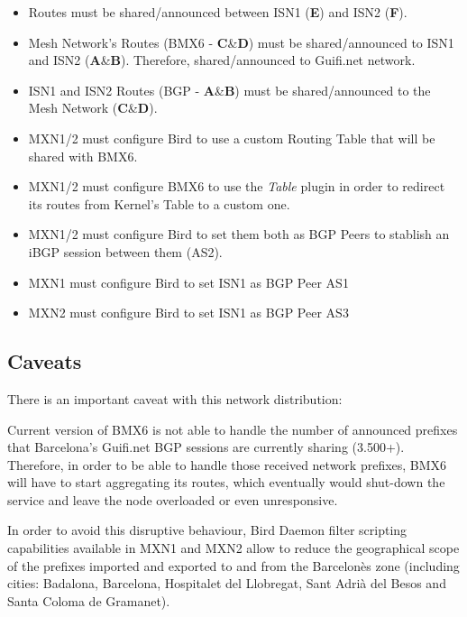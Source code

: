 \begin{itemize}
    \item Routes must be shared/announced between ISN1 (\textbf{E}) and ISN2 (\textbf{F}).
    \item Mesh Network's Routes (BMX6 - \textbf{C}\&\textbf{D}) must be shared/announced to ISN1 and ISN2 (\textbf{A}\&\textbf{B}). Therefore, shared/announced to Guifi.net network.
    \item ISN1 and ISN2 Routes (BGP - \textbf{A}\&\textbf{B}) must be shared/announced to the Mesh Network (\textbf{C}\&\textbf{D}).
    \item MXN1/2 must configure Bird to use a custom Routing Table that will be shared with BMX6.
    \item MXN1/2 must configure BMX6 to use the \textit{Table} plugin in order to redirect its routes from Kernel's Table to a custom one.
    \item MXN1/2 must configure Bird to set them both as BGP Peers to stablish an iBGP session between them (AS2).
    \item MXN1 must configure Bird to set ISN1 as BGP Peer AS1
    \item MXN2 must configure Bird to set ISN1 as BGP Peer AS3
\end{itemize}

\subsection{Caveats}
There is an important caveat with this network distribution:

Current version of BMX6 is not able to handle the number of announced prefixes that Barcelona's Guifi.net BGP sessions are currently sharing (3.500+). Therefore, in order to be able to handle those received network prefixes, BMX6 will have to start aggregating its routes, which eventually would shut-down the service and leave the node overloaded or even unresponsive.

In order to avoid this disruptive behaviour, Bird Daemon filter scripting capabilities available in MXN1 and MXN2 allow to reduce the geographical scope of the prefixes imported and exported to and from the Barcelon\`{e}s zone (including cities: Badalona, Barcelona, Hospitalet del Llobregat, Sant Adri\`{a} del Besos and Santa Coloma de Gramanet).

